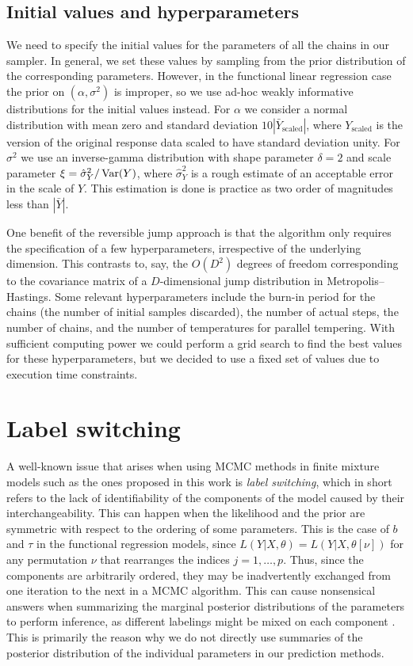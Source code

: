 \subsection{Initial values and hyperparameters}

We need to specify the initial values for the parameters of all the chains in our sampler. In general, we set these values by sampling from the prior distribution of the corresponding parameters. However, in the functional linear regression case the prior on \((\alpha, \sigma^2)\) is improper, so we use ad-hoc weakly informative distributions for the initial values instead. For \(\alpha\) we consider a normal distribution with mean zero and standard deviation \(10|\bar{Y}_{\text{scaled}}|\), where \(Y_{\text{scaled}}\) is the version of the original response data scaled to have standard deviation unity. For \(\sigma^2\) we use an inverse-gamma distribution with shape parameter \(\delta=2\) and scale parameter \(\xi=\hat\sigma^2_Y/\operatorname{Var}(Y)\), where \(\hat \sigma^2_Y\) is a rough estimate of an acceptable error in the scale of \(Y\). This estimation is done is practice as two order of magnitudes less than \(|\bar{Y}|\).

One benefit of the reversible jump approach is that the algorithm only requires the specification of a few hyperparameters, irrespective of the underlying dimension. This contrasts to, say, the \(O(D^2)\) degrees of freedom corresponding to the covariance matrix of a \(D\)-dimensional jump distribution in Metropolis--Hastings. Some relevant hyperparameters include the burn-in period for the chains (the number of initial samples discarded), the number of actual steps, the number of chains, and the number of temperatures for parallel tempering. With sufficient computing power we could perform a grid search to find the best values for these hyperparameters, but we decided to use a fixed set of values due to execution time constraints.

\section{Label switching}

A well-known issue that arises when using \acs{MCMC} methods in finite mixture models such as the ones proposed in this work is \textit{label switching}, which in short refers to the lack of identifiability of the components of the model caused by their interchangeability. This can happen when the likelihood and the prior are symmetric with respect to the ordering of some parameters. This is the case of  \(b\) and \(\tau\) in the functional regression models, since \(L(Y|X,\theta)=L(Y|X, \theta[\nu])\) for any permutation \(\nu\) that rearranges the indices \(j=1,\dots, p\). Thus, since the components are arbitrarily ordered, they may be inadvertently exchanged from one iteration to the next in a \acs{MCMC} algorithm. This can cause nonsensical answers when summarizing the marginal posterior distributions of the parameters to perform inference, as different labelings might be mixed on each component \citep{stephens2000dealing}. This is primarily the reason why we do not directly use summaries of the posterior distribution of the individual parameters in our prediction methods.

